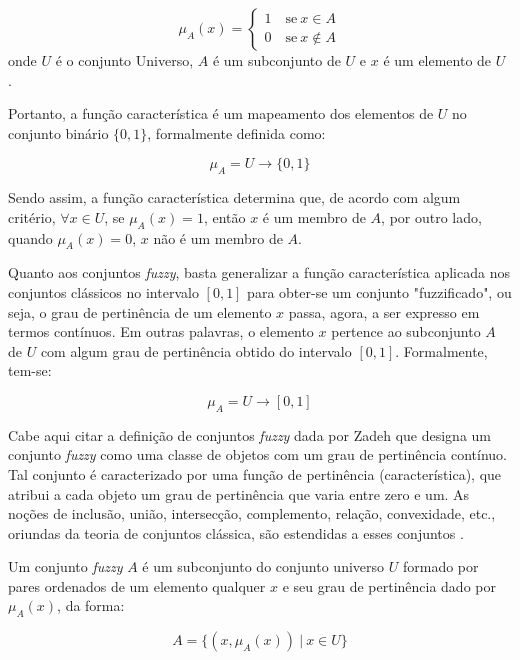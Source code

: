 \begin{equation}
  \mu_A(x) =  \begin{cases}
                1 \quad \text{se}\ x \in A \\
                0 \quad \text{se}\ x \notin A
              \end{cases}
\end{equation}
onde $U$ é o conjunto Universo, $A$ é um subconjunto de $U$ e $x$ é um elemento de $U$ \citep{klir:95}.

Portanto, a função característica é um mapeamento dos elementos de $U$ no conjunto binário $\{0, 1\}$, formalmente definida como:

\begin{equation}
  \mu_A =  U \rightarrow \{0, 1\}
\end{equation}

Sendo assim, a função característica determina que, de acordo com algum critério, $\forall x \in U$, se $\mu_A(x) = 1$, então $x$ é um membro de $A$, por outro lado, quando $\mu_A(x) = 0$, $x$ não é um membro de $A$.

Quanto aos conjuntos \emph{fuzzy}, basta generalizar a função característica aplicada nos conjuntos clássicos no intervalo $[0, 1]$ para obter-se um conjunto "fuzzificado", ou seja, o grau de pertinência de um elemento $x$ passa, agora, a ser expresso em termos contínuos. Em outras palavras, o elemento $x$ pertence ao subconjunto $A$ de $U$ com algum grau de pertinência obtido do intervalo $[0, 1]$. Formalmente, tem-se:

\begin{equation}
  \mu_A =  U \rightarrow [0, 1]
\end{equation}

Cabe aqui citar a definição de conjuntos \emph{fuzzy} dada por Zadeh que designa um conjunto \emph{fuzzy} como uma classe de objetos com um grau de pertinência contínuo. Tal conjunto é caracterizado por uma função de pertinência (característica), que atribui a cada objeto um grau de pertinência que varia entre zero e um. As noções de inclusão, união, intersecção, complemento, relação, convexidade, etc., oriundas da teoria de conjuntos clássica, são estendidas a esses conjuntos \citep{zadeh:65}.

\begin{defn}
Um conjunto \emph{fuzzy} $A$ é um subconjunto do conjunto universo $U$ formado por pares ordenados de um elemento qualquer $x$ e seu grau de pertinência dado por $\mu_A(x)$, da forma:

\begin{equation}
  A =  \{(x, \mu_A(x)) \ |\ x \in U\}
\end{equation}
\end{defn}

